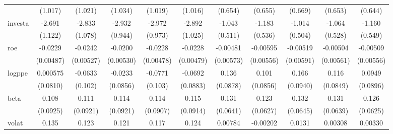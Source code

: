 \begin{table}[htbp]
\begin{tabular}{l*{10}{c}}
                    &     (1.017)         &     (1.021)         &     (1.034)         &     (1.019)         &     (1.016)         &     (0.654)         &     (0.655)         &     (0.669)         &     (0.653)         &     (0.644)         \\
[1em]
investa             &      -2.691\sym{**} &      -2.833\sym{**} &      -2.932\sym{***}&      -2.972\sym{***}&      -2.892\sym{***}&      -1.043\sym{**} &      -1.183\sym{**} &      -1.014\sym{**} &      -1.064\sym{**} &      -1.160\sym{**} \\
                    &     (1.122)         &     (1.078)         &     (0.944)         &     (0.973)         &     (1.025)         &     (0.511)         &     (0.536)         &     (0.504)         &     (0.528)         &     (0.549)         \\
[1em]
roe                 &     -0.0229\sym{***}&     -0.0242\sym{***}&     -0.0200\sym{***}&     -0.0228\sym{***}&     -0.0228\sym{***}&    -0.00481         &    -0.00595         &    -0.00519         &    -0.00504         &    -0.00509         \\
                    &   (0.00487)         &   (0.00527)         &   (0.00530)         &   (0.00478)         &   (0.00479)         &   (0.00573)         &   (0.00556)         &   (0.00591)         &   (0.00561)         &   (0.00556)         \\
[1em]
logppe              &    0.000575         &     -0.0633         &     -0.0233         &     -0.0771         &     -0.0692         &       0.136         &       0.101         &       0.166\sym{*}  &       0.116         &      0.0949         \\
                    &    (0.0810)         &     (0.102)         &    (0.0856)         &     (0.103)         &    (0.0883)         &    (0.0878)         &    (0.0856)         &    (0.0940)         &    (0.0849)         &    (0.0896)         \\
[1em]
beta                &       0.108         &       0.111         &       0.114         &       0.114         &       0.115         &       0.131\sym{**} &       0.123\sym{*}  &       0.132\sym{**} &       0.131\sym{**} &       0.126\sym{**} \\
                    &    (0.0925)         &    (0.0921)         &    (0.0921)         &    (0.0907)         &    (0.0914)         &    (0.0641)         &    (0.0627)         &    (0.0645)         &    (0.0639)         &    (0.0625)         \\
[1em]
volat               &       0.135\sym{*}  &       0.123         &       0.121         &       0.117         &       0.124         &     0.00784         &    -0.00202         &      0.0131         &     0.00308         &     0.00330         \\

\end{tabular}
\end{table}
